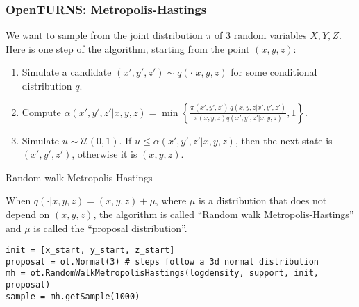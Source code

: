 \documentclass{beamer}
\begin{document}
\begin{frame}[containsverbatim]
\frametitle{OpenTURNS: Metropolis-Hastings}
\small
We want to sample from the joint distribution $\pi$ of 3 random variables $X, Y, Z$.
Here is one step of the algorithm, starting from the point $(x, y, z)$:

\begin{enumerate}
\item Simulate a candidate $(x',y',z') \sim q( \cdot | x, y, z)$ for some conditional distribution $q$.
\item Compute
$
\alpha(x',y',z' | x,y,z) = \min \left\{ \frac{\pi(x',y',z') \, q(x,y,z | x',y',z')}{\pi(x,y,z) q(x',y',z' | x,y,z)} , 1 \right\}.
$
\item Simulate $u \sim \mathcal{U}(0,1)$. If $u \leqslant \alpha(x',y',z' | x,y,z)$,
then the next state is $(x',y',z')$, otherwise it is $(x,y,z)$.
\end{enumerate}

\begin{block}{Random walk Metropolis-Hastings}

When $q(\cdot | x, y, z) = (x,y,z) + \mu$, where $\mu$ is a distribution that does not depend on $(x,y,z)$,
the  algorithm is called ``Random walk Metropolis-Hastings'' and $\mu$ is called the ``proposal distribution''.

\begin{lstlisting}
init = [x_start, y_start, z_start]
proposal = ot.Normal(3) # steps follow a 3d normal distribution
mh = ot.RandomWalkMetropolisHastings(logdensity, support, init, proposal)
sample = mh.getSample(1000)
\end{lstlisting}
\end{block}

\end{frame}
\end{document}
